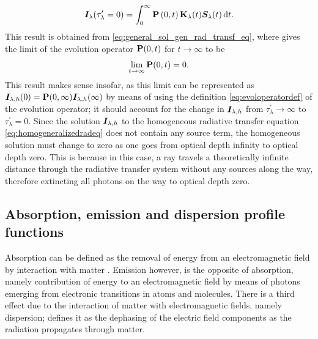 \documentclass[a4paper,12pt]{report}
\begin{document}
\begin{align}
\begin{aligned}
\bm{I}_\lambda(\tau_\lambda^\prime = 0) = \int_{0}^{ \infty}\boldsymbol{\mathbf{P}}\left(0,t\right)\boldsymbol{\mathbf{K}}_\lambda(t)\bm{S}_\lambda(t)\,\mathrm{d}t.
\end{aligned}\end{align} This result is obtained from \cref{eq:general_sol_gen_rad_transf_eq}, where \cite[p.153]{delToroIniesta.2003} gives the limit of the evolution operator $\boldsymbol{\mathbf{P}}(0,t)$ for $t\rightarrow \infty$ to be \begin{equation}
\lim_{t\rightarrow \infty} \boldsymbol{\mathbf{P}}(0,t) = 0.
\end{equation} This result makes sense insofar, as this limit can be represented as $\bm{I}_{\lambda,h}(0) = \boldsymbol{\mathbf{P}}(0,\infty)\bm{I}_{\lambda,h}(\infty)$ by means of using the definition \cref{eq:evoloperatordef} of the evolution operator; it should account for the change in $\bm{I}_{\lambda,h}$ from $\tau_\lambda^\prime \rightarrow \infty$ to $\tau_\lambda^\prime = 0$. Since the solution $\bm{I}_{\lambda,h}$ to the homogeneous radiative transfer equation \cref{eq:homogeneralizedradeq} does not contain any source term, the homogeneous solution must change to zero as one goes from optical depth infinity to optical depth zero. This is because in this case, a ray travels a theoretically infinite distance through the radiative transfer system without any sources along the way, therefore extincting all photons on the way to optical depth zero.

\subsection{Absorption, emission and dispersion profile functions}
Absorption can be defined as the removal of energy from an electromagnetic field by interaction with matter \cite[p.87]{delToroIniesta.2003}. Emission however, is the opposite of absorption, namely contribution of energy to an electromagnetic field by means of photons emerging from electronic transitions in atoms and molecules. There is a third effect due to the interaction of matter with electromagnetic fields, namely dispersion; \cite[p.87]{delToroIniesta.2003} defines it as the dephasing of the electric field components as the radiation propagates through matter.
\end{document}
